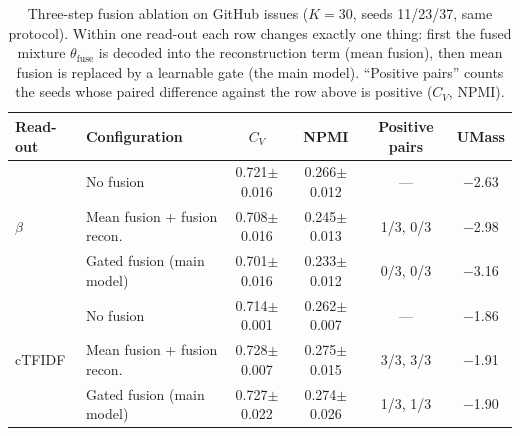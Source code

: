 \documentclass[11pt]{article}
\begin{document}
\begin{table}[t]
\centering
\caption{Three-step fusion ablation on GitHub issues ($K=30$, seeds 11/23/37, same protocol). Within one read-out each row changes exactly one thing: first the fused mixture $\theta_{\mathrm{fuse}}$ is decoded into the reconstruction term (mean fusion), then mean fusion is replaced by a learnable gate (the main model). ``Positive pairs'' counts the seeds whose paired difference against the row above is positive ($C_V$, NPMI).}
\label{tab:fusion}
\small
\begin{tabular}{llcccc}
\toprule
Read-out & Configuration & $C_V$ & NPMI & Positive pairs & UMass \\
\midrule
\multirow{3}{*}{$\beta$} & No fusion & 0.721$\pm$0.016 & 0.266$\pm$0.012 & --- & $-$2.63 \\
 & Mean fusion + fusion recon. & 0.708$\pm$0.016 & 0.245$\pm$0.013 & 1/3, 0/3 & $-$2.98 \\
 & Gated fusion (main model) & 0.701$\pm$0.016 & 0.233$\pm$0.012 & 0/3, 0/3 & $-$3.16 \\
\midrule
\multirow{3}{*}{cTFIDF} & No fusion & 0.714$\pm$0.001 & 0.262$\pm$0.007 & --- & $-$1.86 \\
 & Mean fusion + fusion recon. & 0.728$\pm$0.007 & 0.275$\pm$0.015 & 3/3, 3/3 & $-$1.91 \\
 & Gated fusion (main model) & 0.727$\pm$0.022 & 0.274$\pm$0.026 & 1/3, 1/3 & $-$1.90 \\
\bottomrule
\end{tabular}
\end{table}
\end{document}
